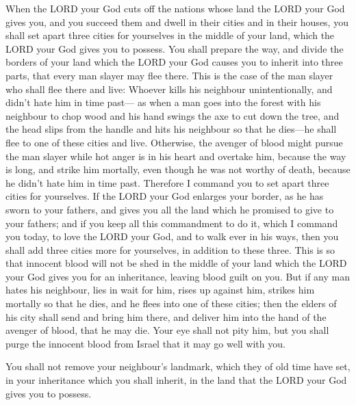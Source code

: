  When the LORD your God cuts off the nations whose land
the LORD your God gives you, and you succeed them and dwell in their
cities and in their houses,  you shall set apart three
cities for yourselves in the middle of your land, which the LORD your
God gives you to possess.  You shall prepare the way, and
divide the borders of your land which the LORD your God causes you to
inherit into three parts, that every man slayer may flee there.
 This is the case of the man slayer who shall flee there
and live: Whoever kills his neighbour unintentionally, and didn't hate
him in time past---  as when a man goes into the forest
with his neighbour to chop wood and his hand swings the axe to cut down
the tree, and the head slips from the handle and hits his neighbour so
that he dies---he shall flee to one of these cities and live.
 Otherwise, the avenger of blood might pursue the man
slayer while hot anger is in his heart and overtake him, because the way
is long, and strike him mortally, even though he was not worthy of
death, because he didn't hate him in time past.  Therefore
I command you to set apart three cities for yourselves. 
If the LORD your God enlarges your border, as he has sworn to your
fathers, and gives you all the land which he promised to give to your
fathers;  and if you keep all this commandment to do it,
which I command you today, to love the LORD your God, and to walk ever
in his ways, then you shall add three cities more for yourselves, in
addition to these three.  This is so that innocent blood
will not be shed in the middle of your land which the LORD your God
gives you for an inheritance, leaving blood guilt on you.
 But if any man hates his neighbour, lies in wait for
him, rises up against him, strikes him mortally so that he dies, and he
flees into one of these cities;  then the elders of his
city shall send and bring him there, and deliver him into the hand of
the avenger of blood, that he may die.  Your eye shall
not pity him, but you shall purge the innocent blood from Israel that it
may go well with you.

 You shall not remove your neighbour's landmark, which
they of old time have set, in your inheritance which you shall inherit,
in the land that the LORD your God gives you to possess.

